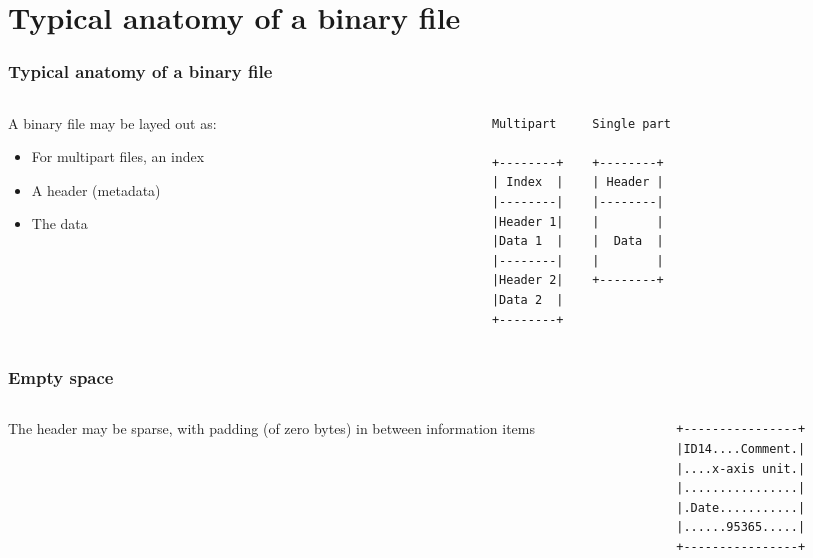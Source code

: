 \documentclass{beamer}
\begin{document}
\section{Typical anatomy of a binary file}
\begin{frame}[fragile]
  \frametitle{Typical anatomy of a binary file}
  \begin{columns}[onlytextwidth]
    \begin{column}{0.4\textwidth}
      A binary file may be layed out as:
      \begin{itemize}
      \item For multipart files, an index
      \item A header (metadata)
      \item The data
      \end{itemize}
    \end{column}
    \begin{column}{0.6\textwidth}
      \begin{verbatim}
        Multipart     Single part

        +--------+    +--------+
        | Index  |    | Header |
        |--------|    |--------|
        |Header 1|    |        |
        |Data 1  |    |  Data  |
        |--------|    |        |
        |Header 2|    +--------+
        |Data 2  |
        +--------+
      \end{verbatim}
    \end{column}
  \end{columns}
\end{frame}

\begin{frame}[fragile]
  \frametitle{Empty space}
  \begin{columns}[onlytextwidth]
    \begin{column}{0.4\textwidth}
      The header may be sparse, with padding (of zero bytes) in between information items
    \end{column}
    \begin{column}{0.6\textwidth}
      \begin{verbatim}
        +----------------+
        |ID14....Comment.|
        |....x-axis unit.|
        |................|
        |.Date...........|
        |......95365.....|
        +----------------+
      \end{verbatim}
    \end{column}
  \end{columns}
\end{frame}
\end{document}
